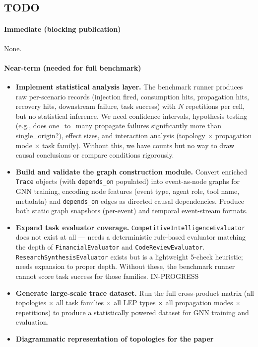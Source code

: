 \subsection{TODO}

\paragraph{Immediate (blocking publication)}
None.

\paragraph{Near-term (needed for full benchmark)}
\begin{itemize}
    \item \textbf{Implement statistical analysis layer.} The benchmark runner produces raw per-scenario records (injection fired, consumption hits, propagation hits, recovery hits, downstream failure, task success) with $N$ repetitions per cell, but no statistical inference. We need confidence intervals, hypothesis testing (e.g., does one\_to\_many propagate failures significantly more than single\_origin?), effect sizes, and interaction analysis (topology $\times$ propagation mode $\times$ task family). Without this, we have counts but no way to draw causal conclusions or compare conditions rigorously.
    \item \textbf{Build and validate the graph construction module.} Convert enriched \texttt{Trace} objects (with \texttt{depends\_on} populated) into event-as-node graphs for GNN training, encoding node features (event type, agent role, tool name, metadata) and \texttt{depends\_on} edges as directed causal dependencies. Produce both static graph snapshots (per-event) and temporal event-stream formats.
    \item \textbf{Expand task evaluator coverage.} \texttt{CompetitiveIntelligenceEvaluator} does not exist at all — needs a deterministic rule-based evaluator matching the depth of \texttt{FinancialEvaluator} and \texttt{CodeReviewEvaluator}. \texttt{ResearchSynthesisEvaluator} exists but is a lightweight 5-check heuristic; needs expansion to proper depth. Without these, the benchmark runner cannot score task success for those families. IN-PROGRESS

    \item \textbf{Generate large-scale trace dataset.} Run the full cross-product matrix (all topologies $\times$ all task families $\times$ all LEP types $\times$ all propagation modes $\times$ repetitions) to produce a statistically powered dataset for GNN training and evaluation.

    \item \textbf{Diagrammatic representation of topologies for the paper}

\end{itemize}

